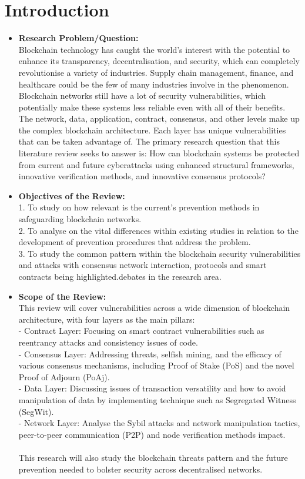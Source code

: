 \documentclass[12pt,a4paper]{article}
\begin{document}
\section{Introduction}
\begin{itemize}
   
\item \textbf{Research Problem/Question:} \\Blockchain technology has caught the world's interest with the potential to enhance its transparency, decentralisation, and security, which can completely revolutionise a variety of industries. Supply chain management, finance, and healthcare could be the few of many industries involve in the phenomenon. Blockchain networks still have a lot of security vulnerabilities, which potentially make these systems less reliable even with all of their benefits. The network, data, application, contract, consensus, and other levels make up the complex blockchain architecture. Each layer has unique vulnerabilities that can be taken advantage of. The primary research question that this literature review seeks to answer is: How can blockchain systems be protected from current and future cyberattacks using enhanced structural frameworks, innovative verification methods, and innovative consensus protocols?
    \item \textbf{Objectives of the Review:} \\1. To study on how relevant is the current's prevention methods in safeguarding blockchain networks.\\2. To analyse on the vital differences within existing studies in relation to the development of prevention procedures that address the problem.\\3. To study the common pattern within the blockchain security vulnerabilities and attacks with consensus network interaction, protocols and smart contracts being highlighted.debates in the research area.
    \item \textbf{Scope of the Review:} \\
    This review will cover vulnerabilities across a wide dimension of blockchain architecture, with four layers as the main pillars:
\\- Contract Layer: Focusing on smart contract vulnerabilities such as reentrancy attacks and consistency issues of code.
\\- Consensus Layer: Addressing threats, selfish mining, and the efficacy of various consensus mechanisms, including Proof of Stake (PoS) and the novel Proof of Adjourn (PoAj).
\\- Data Layer: Discussing issues of transaction versatility and how to avoid manipulation of data by implementing technique such as Segregated Witness (SegWit).
\\- Network Layer: Analyse the Sybil attacks and network manipulation tactics, peer-to-peer communication (P2P) and node verification methods impact.\\
\\This research will also study the blockchain threats pattern and the future prevention needed to bolster security across decentralised networks.
\end{itemize}
\end{document}
